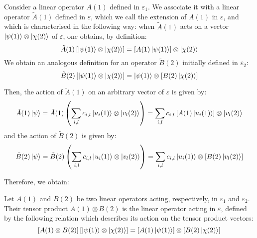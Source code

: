 \begin{definition} \label{tensor_product_operator}
    Consider a linear operator $A(1)$ defined in $\varepsilon_1$. We associate it with a linear operator $\tilde{A}(1)$ defined in $\varepsilon$, which we call the extension of $A(1)$ in $\varepsilon$, and which is characterised in the following way: when $\tilde{A}(1)$ acts on a vector $\ket{\psi(1)}\otimes\ket{\chi(2)}$ of $\varepsilon$, one obtains, by definition:
    \begin{equation}
        \tilde{A}(1)\left[\ket{\psi(1)}\otimes\ket{\chi(2)}\right] = \left[A(1)\ket{\psi(1)}\right]\otimes\ket{\chi(2)}
    \end{equation}
    We obtain an analogous definition for an operator $\tilde{B}(2)$ initially defined in $\varepsilon_2$:
    \begin{equation}
        \tilde{B}(2)\left[\ket{\psi(1)}\otimes\ket{\chi(2)}\right] = \ket{\psi(1)}\otimes\left[B(2)\ket{\chi(2)}\right]
    \end{equation}
\end{definition}
Then, the action of $\tilde{A}(1)$ on an arbitrary vector of $\varepsilon$ is given by:
\begin{equation}
    \tilde{A}(1)\ket{\psi} = \tilde{A}(1)\left(\sum_{i,l} c_{i,l}\ket{u_i(1)}\otimes\ket{v_l(2)}\right) = \sum_{i,l} c_{i,l}\left[A(1)\ket{u_i(1)}\right]\otimes\ket{v_l(2)}
\end{equation}
and the action of $\tilde{B}(2)$ is given by:
\begin{equation}
    \tilde{B}(2)\ket{\psi} = \tilde{B}(2)\left(\sum_{i,l} c_{i,l}\ket{u_i(1)}\otimes\ket{v_l(2)}\right) = \sum_{i,l} c_{i,l}\ket{u_i(1)}\otimes\left[B(2)\ket{v_l(2)}\right]
\end{equation}

Therefore, we obtain:
\begin{definition} \label{tensor_product_operator_2}
    Let $A(1)$ and $B(2)$ be two linear operators acting, respectively, in $\varepsilon_1$ and $\varepsilon_2$. Their tensor product $A(1)\otimes B(2)$ is the linear operator acting in $\varepsilon$, defined by the following relation which describes its action on the tensor product vectors:
    \begin{equation}
        \left[A(1)\otimes B(2)\right]\left[\ket{\psi(1)}\otimes\ket{\chi(2)}\right] = \left[A(1)\ket{\psi(1)}\right]\otimes\left[B(2)\ket{\chi(2)}\right]
    \end{equation}
\end{definition}

